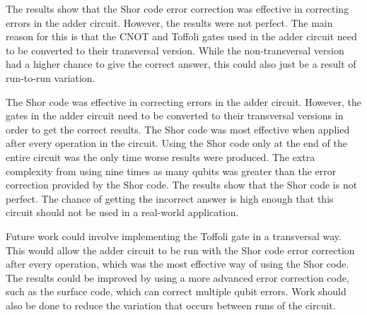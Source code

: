 \documentclass[letterpaper]{article}
\begin{document}
The results show that the Shor code error correction was effective in correcting errors in the adder circuit. However, the results were not perfect. The main reason for this is that the CNOT and Toffoli gates used in the adder circuit need to be converted to their transversal version. While the non-transversal version had a higher chance to give the correct answer, this could also just be a result of run-to-run variation.

The Shor code was effective in correcting errors in the adder circuit. However, the gates in the adder circuit need to be converted to their transversal versions in order to get the correct results. The Shor code was most effective when applied after every operation in the circuit. Using the Shor code only at the end of the entire circuit was the only time worse results were produced. The extra complexity from using nine times as many qubits was greater than the error correction provided by the Shor code. The results show that the Shor code is not perfect. The chance of getting the incorrect answer is high enough that this circuit should not be used in a real-world application.

Future work could involve implementing the Toffoli gate in a transversal way. This would allow the adder circuit to be run with the Shor code error correction after every operation, which was the most effective way of using the Shor code. The results could be improved by using a more advanced error correction code, such as the surface code, which can correct multiple qubit errors. Work should also be done to reduce the variation that occurs between runs of the circuit.
\end{document}
